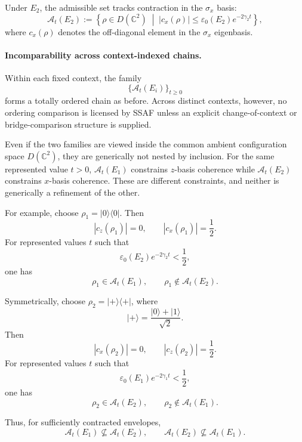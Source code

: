 \documentclass[aps,prx,onecolumn,11pt]{revtex4-2}
\theoremstyle{plain}
\theoremstyle{definition}
\theoremstyle{remark}
\begin{document}
Under \(E_2\), the admissible set tracks contraction in the
\(\sigma_x\) basis:
\begin{equation}
\mathcal A_t(E_2)
:=
\left\{
\rho\in D(\mathbb C^2)
\;\middle|\;
|c_x(\rho)|
\leq
\varepsilon_0(E_2)e^{-2\gamma_2 t}
\right\},
\label{eq:wk_admissible_set_E2}
\end{equation}
where \(c_x(\rho)\) denotes the off-diagonal element in the
\(\sigma_x\) eigenbasis.

\paragraph{Incomparability across context-indexed chains.}

Within each fixed context, the family
\[
\{\mathcal A_t(E_i)\}_{t\geq 0}
\]
forms a totally ordered chain as before. Across distinct contexts,
however, no ordering comparison is licensed by SSAF unless an explicit
change-of-context or bridge-comparison structure is supplied.

Even if the two families are viewed inside the common ambient
configuration space \(D(\mathbb C^2)\), they are generically not nested
by inclusion. For the same represented value \(t>0\), \(\mathcal A_t(E_1)\)
constrains \(z\)-basis coherence while \(\mathcal A_t(E_2)\) constrains
\(x\)-basis coherence. These are different constraints, and neither is
generically a refinement of the other.

For example, choose \(\rho_1=|0\rangle\langle 0|\). Then
\[
|c_z(\rho_1)|=0,
\qquad
|c_x(\rho_1)|=\frac{1}{2}.
\]
For represented values \(t\) such that
\[
\varepsilon_0(E_2)e^{-2\gamma_2 t}<\frac{1}{2},
\]
one has
\[
\rho_1\in\mathcal A_t(E_1),
\qquad
\rho_1\notin\mathcal A_t(E_2).
\]

Symmetrically, choose \(\rho_2=|+\rangle\langle +|\), where
\[
|+\rangle
=
\frac{|0\rangle+|1\rangle}{\sqrt 2}.
\]
Then
\[
|c_x(\rho_2)|=0,
\qquad
|c_z(\rho_2)|=\frac{1}{2}.
\]
For represented values \(t\) such that
\[
\varepsilon_0(E_1)e^{-2\gamma_1 t}<\frac{1}{2},
\]
one has
\[
\rho_2\in\mathcal A_t(E_2),
\qquad
\rho_2\notin\mathcal A_t(E_1).
\]

Thus, for sufficiently contracted envelopes,
\begin{equation}
\mathcal A_t(E_1)\not\subseteq\mathcal A_t(E_2),
\qquad
\mathcal A_t(E_2)\not\subseteq\mathcal A_t(E_1).
\label{eq:wk_incomparability}
\end{equation}
\end{document}

